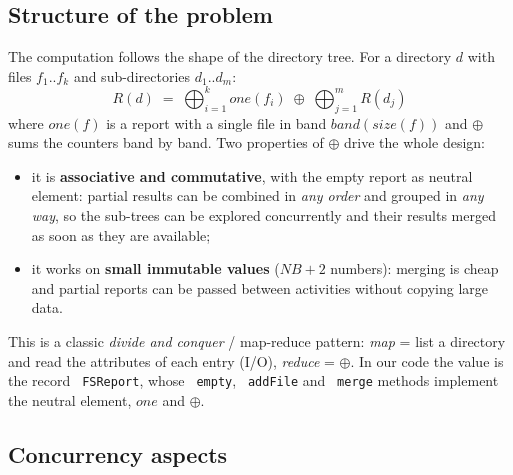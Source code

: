 \documentclass[11pt,a4paper]{article}
\newcommand{\code}[1]{\texttt{\hyphenchar\font=-1 #1}}
\begin{document}
\subsection{Structure of the problem}

The computation follows the shape of the directory tree. For a directory $d$ with files $f_1..f_k$ and
sub-directories $d_1..d_m$:
\[
  R(d) \;=\; \bigoplus_{i=1}^{k} \mathit{one}(f_i) \;\oplus\; \bigoplus_{j=1}^{m} R(d_j)
\]
where $\mathit{one}(f)$ is a report with a single file in band $band(size(f))$ and $\oplus$ sums
the counters band by band. Two properties of $\oplus$ drive the whole design:
\begin{itemize}
  \item it is \textbf{associative and commutative}, with the empty report as neutral element: partial
        results can be combined in \emph{any order} and grouped in \emph{any way}, so the sub-trees
        can be explored concurrently and their results merged as soon as they are available;
  \item it works on \textbf{small immutable values} ($NB+2$ numbers): merging is cheap and partial
        reports can be passed between activities without copying large data.
\end{itemize}
This is a classic \emph{divide and conquer} / map-reduce pattern: \emph{map} = list a directory and
read the attributes of each entry (I/O), \emph{reduce} = $\oplus$. In our code the value is the record
\code{FSReport}, whose \code{empty}, \code{addFile} and \code{merge} methods implement the neutral
element, $\mathit{one}$ and $\oplus$.

\subsection{Concurrency aspects}
\end{document}

